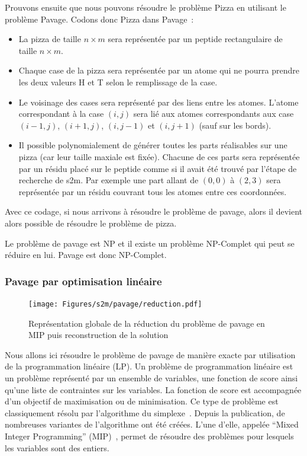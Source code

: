 Prouvons ensuite que nous pouvons résoudre le problème Pizza en utilisant le problème Pavage.
Codons donc Pizza dans Pavage~:
\begin{itemize}
	\item La pizza de taille $n \times m$ sera représentée par un peptide rectangulaire de taille $n \times m$.
	\item Chaque case de la pizza sera représentée par un atome qui ne pourra prendre les deux valeurs H et T selon le remplissage de la case.
	\item Le voisinage des cases sera représenté par des liens entre les atomes.
	L'atome correspondant à la case $(i,j)$ sera lié aux atomes correspondants aux case $(i-1,j)$, $(i+1,j)$, $(i,j-1)$ et $(i,j+1)$ (sauf sur les bords).
	\item Il possible polynomialement de générer toutes les parts réalisables sur une pizza (car leur taille maxiale est fixée).
	Chacune de ces parts sera représentée par un résidu placé sur le peptide comme si il avait été trouvé par l'étape de recherche de s2m.
	Par exemple une part allant de $(0,0)$ à $(2,3)$ sera représentée par un résidu couvrant tous les atomes entre ces coordonnées.
\end{itemize}

Avec ce codage, si nous arrivons à résoudre le problème de pavage, alors il devient alors possible de résoudre le problème de pizza.

Le problème de pavage est NP et il existe un problème NP-Complet qui peut se réduire en lui.
Pavage est donc NP-Complet.




\subsubsection{Pavage par optimisation linéaire}

\label{MIP_p}

\begin{figure}
  \texttt{[image: Figures/s2m/pavage/reduction.pdf]}
  \caption{\label{reduction}Représentation globale de la réduction du problème de pavage en MIP puis reconstruction de la
  solution}
\end{figure}

Nous allons ici résoudre le problème de pavage de manière exacte par utilisation de la programmation linéaire (LP).
Un problème de programmation linéaire est un problème représenté par un ensemble de variables, une fonction de score ainsi qu'une liste de contraintes sur les variables.
La fonction de score est accompagnée d'un objectif de maximisation ou de minimisation.
Ce type de problème est classiquement résolu par l'algorithme du simplexe~\cite{murty_linear_1983}.
Depuis la publication, de nombreuses variantes de l'algorithme ont été créées.
L'une d'elle, appelée ``Mixed Integer Programming'' (MIP)~\cite{wolsey_mixed_2007}, permet de résoudre des problèmes pour lesquels les variables sont des entiers.


